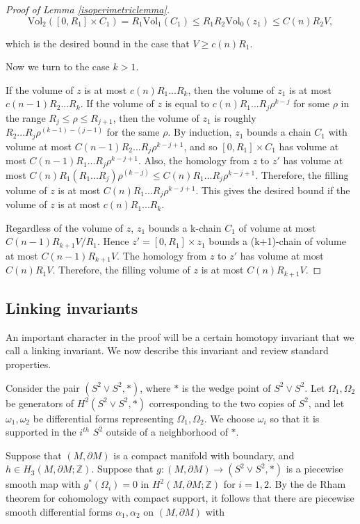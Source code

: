 \documentclass{amsart}
\newtheorem*{theorem 1}{Theorem 1}
\newtheorem*{theorem 2}{Theorem 2}
\newtheorem*{theorem 3}{Theorem 3}
\numberwithin{equation}{section}
\newcommand{\Vol}{\textrm{Vol}}
\newcommand{\ZZ}{\mathbb{Z}}
\begin{document}
\begin{proof} [Proof of Lemma \ref{isoperimetriclemma}]
$$ \Vol_2([0,R_1] \times C_1) = R_1 \Vol_1(C_1) \le R_1 R_2 \Vol_0(z_1) \le C(n) R_2 V,$$

\noindent which is the desired bound in the case that $V \ge c(n) R_1$.

Now we turn to the case $k > 1$.  

If the volume of $z$ is at most $c(n) R_1 ... R_k$, then the
volume of $z_1$ is at most $c(n-1) R_2 ... R_k$.  If the volume
of $z$ is equal to $c(n) R_1 ... R_j \rho^{k-j}$ for some $\rho$ in
the range $R_j \le \rho \le R_{j+1}$, then the volume of $z_1$ is
roughly $R_2 ... R_j \rho^{(k-1) - (j-1)}$ for the same $\rho$. 
By induction, $z_1$ bounds a chain $C_1$ with volume at most
$C(n-1) R_2 ... R_j \rho^{k-j+1}$, and so $[0, R_1] \times C_1$
has volume at most $C(n-1) R_1 ... R_j \rho^{k-j+1}$.  Also, the
homology from $z$ to $z'$ has volume at most $C(n) R_1 (R_1 ...
R_j) \rho^{(k-j)} \le C(n) R_1 ... R_j \rho^{k-j+1}$. Therefore,
the filling volume of $z$ is at most $C(n) R_1 ... R_j
\rho^{k-j+1}$.  This gives the desired bound if the volume of $z$ is at most $c(n) R_1 ... R_k$.

Regardless of the volume of $z$,  $z_1$ bounds a k-chain $C_1$ of volume at most
$C(n-1) R_{k+1} V / R_1$. Hence $z' = [0,R_1] \times z_1$ bounds
a (k+1)-chain of volume at most $C(n-1) R_{k+1} V$.  The homology
from $z$ to $z'$ has volume at most $C(n) R_1 V$.  Therefore, the
filling volume of $z$ is at most $C(n) R_{k+1} V$. \end{proof}



\subsection{Linking invariants}


An important character in the proof will be a certain homotopy invariant that we call a linking invariant.   We now describe this invariant and review standard properties.

 Consider the pair $(S^2 \vee S^2, *)$,  where $*$ is the wedge point of $S^2 \vee S^2$.    Let $\Omega_1, \Omega_2$ be generators of $H^2(S^2 \vee S^2,  *)$ corresponding to the two copies of $S^2$,  and let $\omega_1, \omega_2$ be differential forms representing $\Omega_1,  \Omega_2$.   We choose $\omega_i$ so that it is supported in the $i^{th}$ $S^2$ outside of a neighborhood of $*$. 

Suppose that $(M,  \partial M)$ is a compact manifold with boundary,  and $h \in H_3(M,  \partial M; \ZZ)$.   Suppose that $g: (M,  \partial M) \rightarrow (S^2 \vee S^2,  *)$ is a piecewise smooth map with $g^*(\Omega_i) = 0$ in $H^2(M,  \partial M; \ZZ)$ for $i=1,2$.   By the de Rham theorem for cohomology with compact support,  it follows that there are piecewise smooth differential forms $\alpha_1,  \alpha_2$ on $(M, \partial M)$ with
\end{document}
